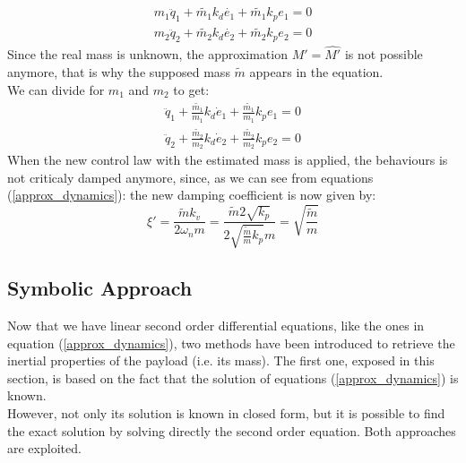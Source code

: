 \documentclass[a4paper,12pt,oneside]{report}
\begin{document}
\begin{equation}
  \begin{array}{l}
    m_1\ddot{q}_1+\tilde{m_1}k_d\dot{e_1}+\tilde{m_1}k_p e_1=0\\
    m_2\ddot{q}_2+\tilde{m_2}k_d\dot{e_2}+\tilde{m_2}k_p e_2=0
  \end{array}
\end{equation}
Since the real mass is unknown, the approximation $M'=\hat{M'}$ is not possible anymore, that is why the supposed mass $\tilde{m}$ appears in the equation.\\
We can divide for $m_1$ and $m_2$ to get:
\begin{equation}
  \begin{array}{l}
    \ddot{q}_1+\frac{\tilde{m_1}}{m_1}k_d\dot{e}_1+\frac{\tilde{m_1}}{m_1}k_p e_1=0\\
    \ddot{q}_2+\frac{\tilde{m_2}}{m_2}k_d\dot{e}_2+\frac{\tilde{m_2}}{m_2}k_p e_2=0
  \end{array}
  \label{approx_dynamics}
\end{equation}
When the new control law with the estimated mass is applied, the behaviours is not criticaly damped anymore, since, as we can see from equations (\ref{approx_dynamics}): the new damping coefficient is now given by:
\begin{equation}
  \xi'=\frac{\tilde{m}k_v}{2\omega_n m}=\frac{\tilde{m}2\sqrt{k_p}}{2\sqrt{\frac{\tilde{m}}{m}k_p} m}=\sqrt{\frac{\tilde{m}}{m}}
  \label{mass_relation}
\end{equation}
\newpage
\subsection{Symbolic Approach}
Now that we have linear second order differential equations, like the ones in equation (\ref{approx_dynamics}), two methods have been introduced to retrieve the inertial properties of the payload (i.e. its mass). The first one, exposed in this section, is based on the fact that the solution of equations (\ref{approx_dynamics}) is known.\\
However, not only its solution is known in closed form, but it is possible to find the exact solution by solving directly the second order equation. Both approaches are exploited.
\end{document}
